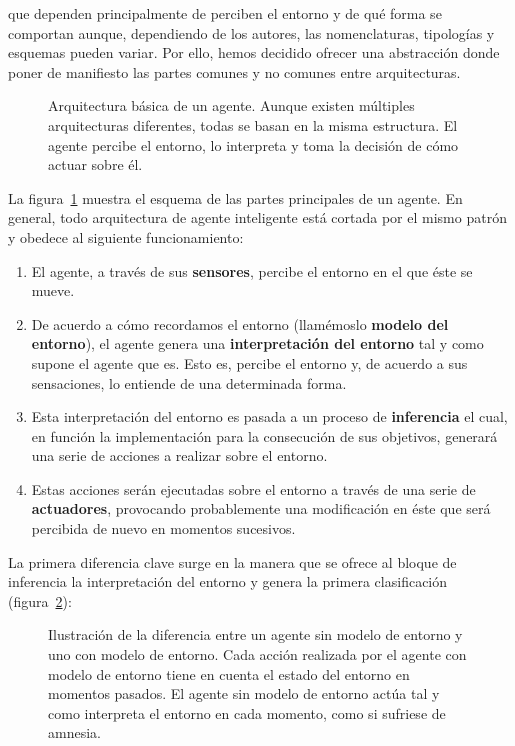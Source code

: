 que dependen principalmente de perciben el entorno y de qué forma se comportan aunque, dependiendo de los autores, las nomenclaturas, tipologías y esquemas pueden variar. Por ello, hemos decidido ofrecer una abstracción donde poner de manifiesto las partes comunes y no comunes entre arquitecturas.

\begin{figure}
	\caption{Arquitectura básica de un agente. Aunque existen múltiples arquitecturas diferentes, todas se basan en la misma estructura. El agente percibe el entorno, lo interpreta y toma la decisión de cómo actuar sobre él.}
	\label{fig:agent-basic-architecture}
\end{figure}

La figura~\ref{fig:agent-basic-architecture} muestra el esquema de las partes principales de un agente. En general, todo arquitectura de agente inteligente está cortada por el mismo patrón y obedece al siguiente funcionamiento:

\begin{enumerate}
	\item El agente, a través de sus \textbf{sensores}, percibe el entorno en el que éste se mueve.
	\item De acuerdo a cómo recordamos el entorno (llamémoslo \textbf{modelo del entorno}), el agente genera una \textbf{interpretación del entorno} tal y como supone el agente que es. Esto es, percibe el entorno y, de acuerdo a sus sensaciones, lo entiende de una determinada forma.
	\item Esta interpretación del entorno es pasada a un proceso de \textbf{inferencia} el cual, en función la implementación para la consecución de sus objetivos, generará una serie de acciones a realizar sobre el entorno.
	\item Estas acciones serán ejecutadas sobre el entorno a través de una serie de \textbf{actuadores}, provocando probablemente una modificación en éste que será percibida de nuevo en momentos sucesivos.
\end{enumerate}

La primera diferencia clave surge en la manera que se ofrece al bloque de inferencia la interpretación del entorno y genera la primera clasificación (figura~\ref{fig:memory-vs-amnesia-in-agents}):

\begin{figure}
	\caption{Ilustración de la diferencia entre un agente sin modelo de entorno y uno con modelo de entorno. Cada acción realizada por el agente con modelo de entorno tiene en cuenta el estado del entorno en momentos pasados. El agente sin modelo de entorno actúa tal y como interpreta el entorno en cada momento, como si sufriese de amnesia.}
	\label{fig:memory-vs-amnesia-in-agents}
\end{figure}

